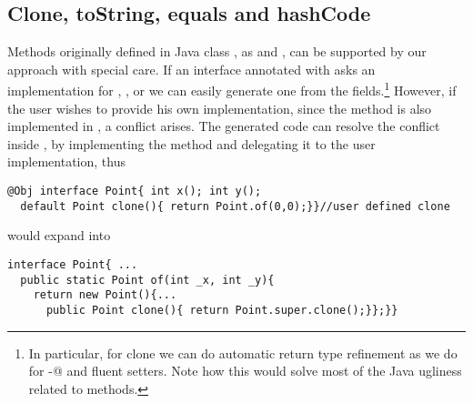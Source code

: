 \begin{comment}
\subsection{Class Invariants in ClassLess Java}
Since objects are created by automatically generated methods, another limitation
of our current approach is that there is no place where the user can dynamically
check for class invariants. In Java often we see code like
\begin{lstlisting}
class Point{ int x; int y;
  Point(int x; int y){this.x=x;this.y=y; assert this.checkInvariant();}
  private boolean checkInvariant(){... x>0,y>0...}
}
\end{lstlisting} 

We are considering an extension of our annotation where 
default methods with the special name \Q@checkInvariant()@ will be called inside the \Q@of@ methods.
If multiple interfaces are implemented, and more then one offers
\Q@checkInvariant()@,  a composed implementation could be automatically generated, composing by \Q@&&@ the various competing implementations.
\end{comment}

\subsection{Clone, toString, equals and hashCode}

Methods originally defined in Java class \Q@Object@, as \Q@clone@ and
\Q@toString@, can be supported by our approach with special care. If an
interface annotated with \mixin asks an implementation for \Q@clone@,
\Q@toString@, \Q@equals@ or \Q@hashCode@ we can easily generate one from the
fields.\footnote{In particular, for clone we can do automatic return type
  refinement as we do for \Q@with-@ and fluent setters. Note how this would
  solve most of the Java ugliness related to \Q@clone@ methods.}  However, if
the user wishes to provide his own implementation, since the method is also
implemented in \Q@Object@, a conflict arises. The generated code can resolve the
conflict inside \Q@of@, by implementing the method and delegating it to the user
implementation, thus

\begin{lstlisting}
@Obj interface Point{ int x(); int y();
  default Point clone(){ return Point.of(0,0);}}//user defined clone
\end{lstlisting} 
would expand into 

\begin{lstlisting}
interface Point{ ...
  public static Point of(int _x, int _y){
    return new Point(){...
      public Point clone(){ return Point.super.clone();}};}}
\end{lstlisting} 
